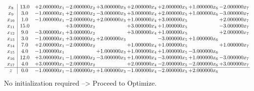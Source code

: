 \documentclass[10pt]{article}
\begin{document}
\[\begin{array}{c| c c@{\hskip 2pt} c@{\hskip 2pt} c@{\hskip 2pt} c@{\hskip 2pt} c@{\hskip 2pt} c@{\hskip 2pt} c@{\hskip 2pt} }
 x_{8}   &  13.0 & + 2.000000 x_{1} & -2.000000 x_{2} & + 3.000000 x_{3} & + 2.000000 x_{4} & + 2.000000 x_{5} & + 1.000000 x_{6} & -2.000000 x_{7}\\
 x_{9}   &  3.0 & -1.000000 x_{1} & + 2.000000 x_{2} & -3.000000 x_{3} & + 3.000000 x_{4} & + 2.000000 x_{5} & + 1.000000 x_{6} & -3.000000 x_{7}\\
 x_{10}   &  1.0 & -1.000000 x_{1} & -2.000000 x_{2} & + 2.000000 x_{3} & + 1.000000 x_{4} & + 3.000000 x_{5} &   & + 2.000000 x_{7}\\
 x_{11}   &  15.0  &   & + 3.000000 x_{2} &   & + 3.000000 x_{4} & + 1.000000 x_{5} &   & -3.000000 x_{7}\\
 x_{12}   &  9.0 & -3.000000 x_{1} & + 3.000000 x_{2} &   & + 3.000000 x_{4} & + 1.000000 x_{5} &   & + 2.000000 x_{7}\\
 x_{13}   &  3.0 & -1.000000 x_{1} & + 3.000000 x_{2} & + 2.000000 x_{3} &   & -3.000000 x_{5} & + 1.000000 x_{6} &   \\
 x_{14}   &  7.0 & + 2.000000 x_{1} & -2.000000 x_{2} &   & + 1.000000 x_{4} & + 1.000000 x_{5} &   & + 1.000000 x_{7}\\
 x_{15}   &  4.0 & -1.000000 x_{1} &   & + 1.000000 x_{3} & + 1.000000 x_{4} & + 1.000000 x_{5} & -3.000000 x_{6} &   \\
 x_{16}   &  12.0 & + 3.000000 x_{1} & -1.000000 x_{2} & -3.000000 x_{3} & + 1.000000 x_{4} & -3.000000 x_{5} & + 1.000000 x_{6} & -3.000000 x_{7}\\
 x_{17}   &  4.0 & + 3.000000 x_{1} & -2.000000 x_{2} &   & + 2.000000 x_{4} & -2.000000 x_{5} & -2.000000 x_{6} & + 3.000000 x_{7}\\
\hline
z    &  0.0 & -1.000000 x_{1} & -1.000000 x_{2} & + 1.000000 x_{3} & -1.000000 x_{4} & -2.000000 x_{5} & + 2.000000 x_{6} &   \\
\end{array}\]
No initialization required --> Proceed to Optimize. 
\end{document}
